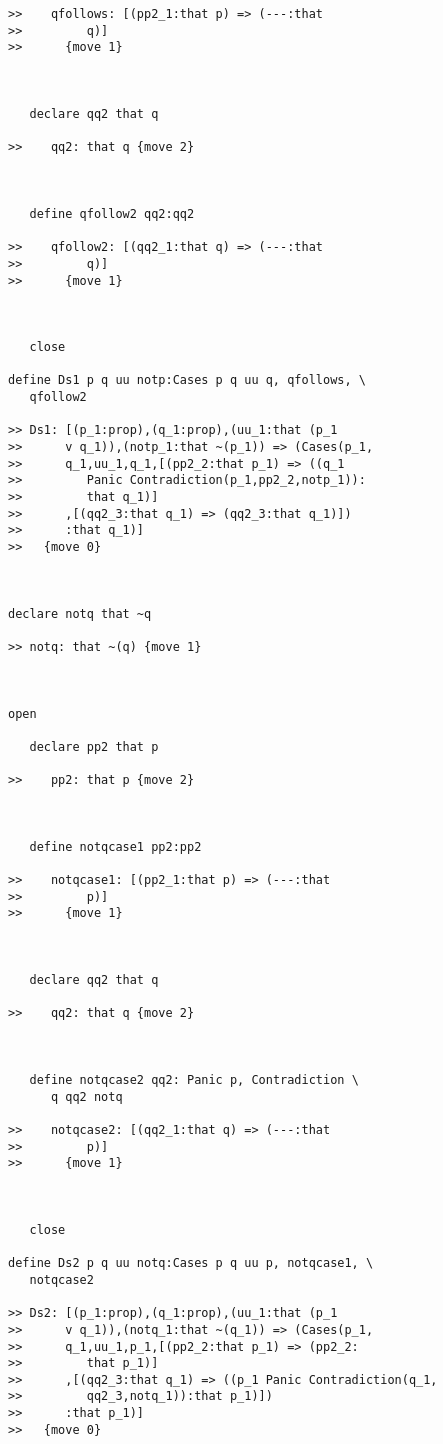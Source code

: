 \begin{verbatim}
>>    qfollows: [(pp2_1:that p) => (---:that
>>         q)]
>>      {move 1}



   declare qq2 that q

>>    qq2: that q {move 2}



   define qfollow2 qq2:qq2

>>    qfollow2: [(qq2_1:that q) => (---:that
>>         q)]
>>      {move 1}



   close

define Ds1 p q uu notp:Cases p q uu q, qfollows, \
   qfollow2

>> Ds1: [(p_1:prop),(q_1:prop),(uu_1:that (p_1
>>      v q_1)),(notp_1:that ~(p_1)) => (Cases(p_1,
>>      q_1,uu_1,q_1,[(pp2_2:that p_1) => ((q_1
>>         Panic Contradiction(p_1,pp2_2,notp_1)):
>>         that q_1)]
>>      ,[(qq2_3:that q_1) => (qq2_3:that q_1)])
>>      :that q_1)]
>>   {move 0}



declare notq that ~q

>> notq: that ~(q) {move 1}



open

   declare pp2 that p

>>    pp2: that p {move 2}



   define notqcase1 pp2:pp2

>>    notqcase1: [(pp2_1:that p) => (---:that
>>         p)]
>>      {move 1}



   declare qq2 that q

>>    qq2: that q {move 2}



   define notqcase2 qq2: Panic p, Contradiction \
      q qq2 notq

>>    notqcase2: [(qq2_1:that q) => (---:that
>>         p)]
>>      {move 1}



   close

define Ds2 p q uu notq:Cases p q uu p, notqcase1, \
   notqcase2

>> Ds2: [(p_1:prop),(q_1:prop),(uu_1:that (p_1
>>      v q_1)),(notq_1:that ~(q_1)) => (Cases(p_1,
>>      q_1,uu_1,p_1,[(pp2_2:that p_1) => (pp2_2:
>>         that p_1)]
>>      ,[(qq2_3:that q_1) => ((p_1 Panic Contradiction(q_1,
>>         qq2_3,notq_1)):that p_1)])
>>      :that p_1)]
>>   {move 0}



\end{verbatim}
